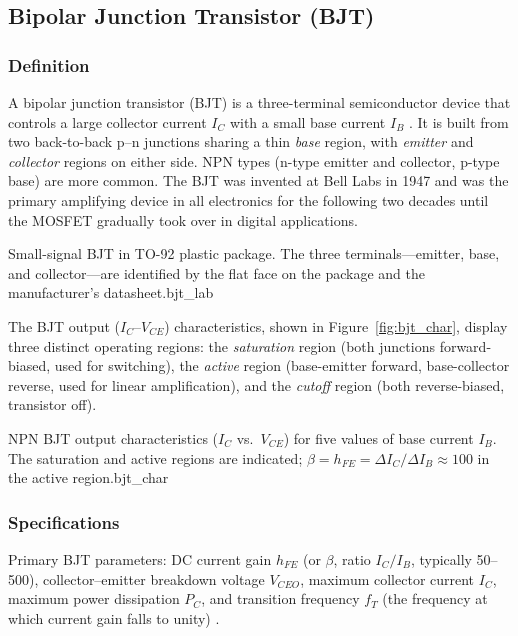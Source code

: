 \subsection{Bipolar Junction Transistor (BJT)}

\subsubsection*{Definition}
A bipolar junction transistor (BJT) is a three-terminal semiconductor device that
controls a large collector current $I_C$ with a small base current $I_B$ \cite{boylestad2015}.
It is built from two back-to-back p--n junctions sharing a thin \textit{base} region,
with \textit{emitter} and \textit{collector} regions on either side. NPN types (n-type
emitter and collector, p-type base) are more common. The BJT was invented at Bell Labs
in 1947 and was the primary amplifying device in all electronics for the following two
decades until the MOSFET gradually took over in digital applications.

%
  {Small-signal BJT in TO-92 plastic package. The three terminals---emitter,
   base, and collector---are identified by the flat face on the package
   and the manufacturer's datasheet.}{bjt_lab}

The BJT output ($I_C$--$V_{CE}$) characteristics, shown in Figure~\ref{fig:bjt_char},
display three distinct operating regions: the \textit{saturation} region (both junctions
forward-biased, used for switching), the \textit{active} region (base-emitter forward,
base-collector reverse, used for linear amplification), and the \textit{cutoff} region
(both reverse-biased, transistor off).

%
  {NPN BJT output characteristics ($I_C$ vs.\ $V_{CE}$) for five values
   of base current $I_B$. The saturation and active regions are indicated;
   $\beta = h_{FE} = \Delta I_C / \Delta I_B \approx 100$ in the active region.}{bjt_char}

\subsubsection*{Specifications}
Primary BJT parameters: DC current gain $h_{FE}$ (or $\beta$, ratio $I_C/I_B$, typically
50--500), collector--emitter breakdown voltage $V_{CEO}$, maximum collector current $I_C$,
maximum power dissipation $P_C$, and transition frequency $f_T$ (the frequency at which
current gain falls to unity) \cite{sedra2020}.

